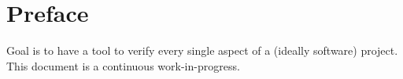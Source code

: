 \documentclass[
	fontsize=10pt, %
	twoside=false, %
	secnumdepth=1, %
]{kaobook}
\begin{document}
\maketitle


\chapter*{Preface}

Goal is to have a tool to verify every single aspect of a (ideally software) project.
This document is a continuous work-in-progress.


\begingroup %

	\setlength{\textheight}{230\vscale} %

	\etocstandarddisplaystyle %
	\etocstandardlines %

	\tableofcontents %




\endgroup

\end{document}
